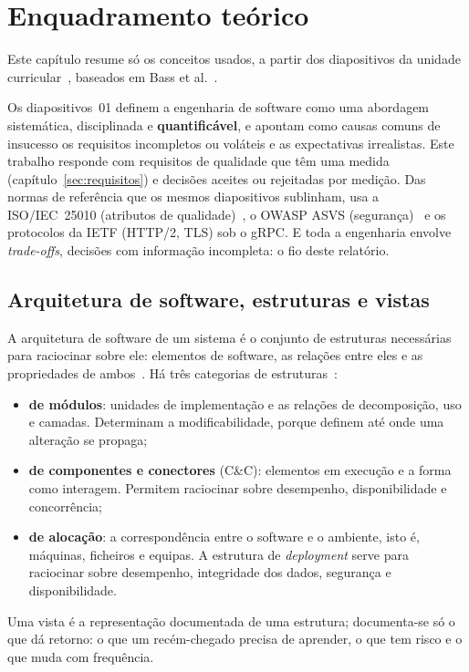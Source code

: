 \section{Enquadramento teórico}
\label{sec:enquadramento}

Este capítulo resume só os conceitos usados, a partir dos diapositivos da unidade
curricular~\cite{bastofernandes2026}, baseados em Bass et al.~\cite{bass2012}.

Os diapositivos~01 definem a engenharia de software como uma abordagem sistemática, disciplinada e
\textbf{quantificável}, e apontam como causas comuns de insucesso os requisitos incompletos ou voláteis e as
expectativas irrealistas. Este trabalho responde com requisitos de qualidade que têm uma medida
(capítulo~\ref{sec:requisitos}) e decisões aceites ou rejeitadas por medição. Das normas de referência que os mesmos
diapositivos sublinham, usa a ISO/IEC~25010 (atributos de qualidade)~\cite{iso25010}, o OWASP ASVS
(segurança)~\cite{owaspasvs5} e os protocolos da IETF (HTTP/2, TLS) sob o gRPC. E toda a engenharia envolve
\emph{trade-offs}, decisões com informação incompleta: o fio deste relatório.

\subsection{Arquitetura de software, estruturas e vistas}

A arquitetura de software de um sistema é o conjunto de estruturas necessárias para raciocinar sobre
ele: elementos de software, as relações entre eles e as propriedades de ambos~\cite{bass2012}. Há três
categorias de estruturas~\cite{bastofernandes2026}:
\begin{itemize}
  \item \textbf{de módulos}: unidades de implementação e as relações de decomposição, uso e camadas.
        Determinam a modificabilidade, porque definem até onde uma alteração se propaga;
  \item \textbf{de componentes e conectores} (C\&C): elementos em execução e a forma como interagem.
        Permitem raciocinar sobre desempenho, disponibilidade e concorrência;
  \item \textbf{de alocação}: a correspondência entre o software e o ambiente, isto é, máquinas,
        ficheiros e equipas. A estrutura de \emph{deployment} serve para raciocinar sobre desempenho,
        integridade dos dados, segurança e disponibilidade.
\end{itemize}
Uma vista é a representação documentada de uma estrutura; documenta-se só o que dá retorno: o que um recém-chegado
precisa de aprender, o que tem risco e o que muda com frequência.

